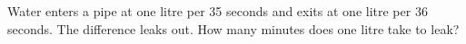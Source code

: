Water enters a pipe at one litre per 35 seconds and exits at one litre per 36 seconds. The difference leaks out. How many minutes does one litre take to leak?
